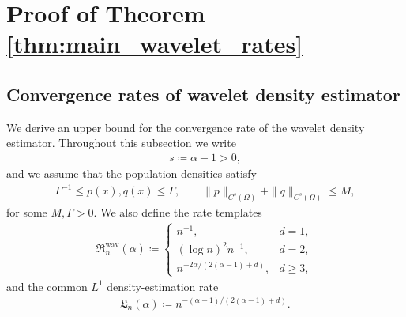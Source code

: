 \documentclass[11pt,reqno]{amsart}
\theoremstyle{definition}
\begin{document}
\section{Proof of Theorem \ref{thm:main_wavelet_rates}} \label{sec:proof_wavelet}

\subsection{Convergence rates of wavelet density estimator}

We derive an upper bound for the convergence rate of the wavelet density estimator. Throughout this subsection we write
\begin{align}
    s \coloneqq \alpha-1 > 0,
\end{align}
and we assume that the population densities satisfy
\begin{align}
    \Gamma^{-1} \le p(x), q(x) \le \Gamma,
    \qquad
    \|p\|_{C^{s}(\Omega)} + \|q\|_{C^{s}(\Omega)} \le M,
\end{align}
for some $M,\Gamma>0$. We also define the rate templates
\begin{align}
    \mathfrak R_n^{\mathrm{wav}}(\alpha)
    \coloneqq
    \begin{cases}
        n^{-1}, & d=1,\\
        (\log n)^2 n^{-1}, & d=2,\\
        n^{{-2\alpha/(2(\alpha-1)+d)}}, & d\ge 3,
    \end{cases}
\end{align}
and the common $L^1$ density-estimation rate
\begin{align}
    \mathfrak L_n(\alpha)
    \coloneqq
    n^{{-(\alpha-1)/(2(\alpha-1)+d)}}.
\end{align}
\end{document}
